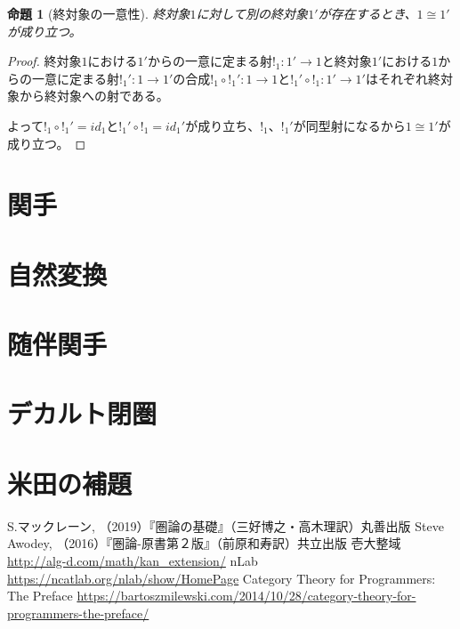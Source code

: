 \documentclass[dvipdfmx]{jsarticle}
\newcommand{\arrow}{\rightarrow}
\newcommand{\mor}[3]{#1:#2\arrow #3}
\newtheorem{proof}{証明}[section]
\newtheorem{prop}{命題}[section]
\begin{document}
	\begin{prop}[終対象の一意性]
		終対象$1$に対して別の終対象$1'$が存在するとき、$1\cong 1'$が成り立つ。
	\end{prop}
	\begin{proof}
		終対象$1$における$1'$からの一意に定まる射$\mor{!_1}{1'}{1}$と終対象$1'$における$1$からの一意に定まる射$\mor{{!_1}'}{1}{1'}$の合成$\mor{!_1\circ {!_1}'}{1}{1}$と$\mor{{!_1}'\circ!_1}{1'}{1'}$はそれぞれ終対象から終対象への射である。

		よって$!_1\circ {!_1}'=id_1$と${!_1}'\circ!_1=id_1'$が成り立ち、$!_1$、${!_1}'$が同型射になるから$1\cong 1'$が成り立つ。
	\end{proof}
	\section{関手}
	\section{自然変換}
	\section{随伴関手}
	\section{デカルト閉圏}
	\section{米田の補題}

	\begin{thebibliography}{99}
	 S.マックレーン, （2019）『圏論の基礎』（三好博之・高木理訳）丸善出版
	 Steve Awodey, （2016）『圏論-原書第２版』（前原和寿訳）共立出版
	 壱大整域 \url{http://alg-d.com/math/kan_extension/}
	 nLab \url{https://ncatlab.org/nlab/show/HomePage}
	 Category Theory for Programmers: The Preface \url{https://bartoszmilewski.com/2014/10/28/category-theory-for-programmers-the-preface/}
	\end{thebibliography}
\end{document}
